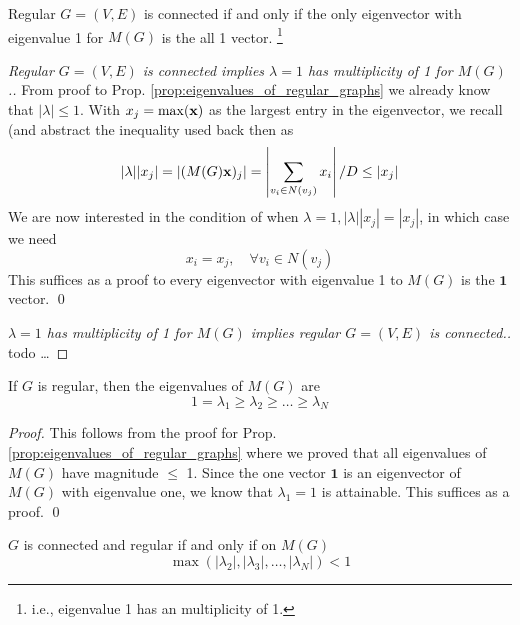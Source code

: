 \begin{proposition}
	Regular $G = (V, E)$ is connected if and only if the only eigenvector with eigenvalue 1 for $M(G)$ is the all 1 vector. \footnote{i.e., eigenvalue 1 has an multiplicity of 1.}
\end{proposition}

\begin{proof} [Regular $G = (V, E)$ is connected implies $\lambda = 1$ has multiplicity of 1 for $M(G)$.]
	From proof to Prop. \ref{prop:eigenvalues_of_regular_graphs} we already know that $|\lambda| \leq 1$. With $x_j = \max(\mathbf{x})$ as the largest entry in the eigenvector, we recall (and abstract the inequality used back then as
	\begin{equation}
		|\lambda||x_j| = |(M(G)\mathbf{x})_j| = \left| \sum_{v_i \in N(v_j)} x_i \right| / D \leq |x_j| 
	\end{equation}
	We are now interested in the condition of when $\lambda = 1, |\lambda| |x_j| = |x_j|$, in which case we need 
	\begin{equation}
		x_i = x_j, \quad \forall v_i \in N(v_j)
	\end{equation}
	This suffices as a proof to every eigenvector with eigenvalue 1 to $M(G)$ is the $\mathbf 1$ vector. \qed
\end{proof}

\begin{proof} [$\lambda = 1$ has multiplicity of 1 for $M(G)$ implies regular $G = (V, E)$ is connected.]
	todo \dots
\end{proof}

\begin{proposition}
	If $G$ is regular, then the eigenvalues of $M(G)$ are 
	\begin{equation}
		1 = \lambda_1 \geq \lambda_2 \geq \dots \geq \lambda_N
	\end{equation}
\end{proposition}

\begin{proof}
	This follows from the proof for Prop. \ref{prop:eigenvalues_of_regular_graphs} where we proved that all eigenvalues of $M(G)$ have magnitude $\leq$ 1. Since the one vector $\mathbf 1$ is an eigenvector of $M(G)$ with eigenvalue one, we know that $\lambda_1 = 1$ is attainable. This suffices as a proof. \qed
\end{proof}

\begin{proposition}
	$G$ is connected and regular if and only if on $M(G)$
	\begin{equation}
		\max ( |\lambda_2| , |\lambda_3|, \dots, |\lambda_N|) < 1
	\end{equation}
\end{proposition}

